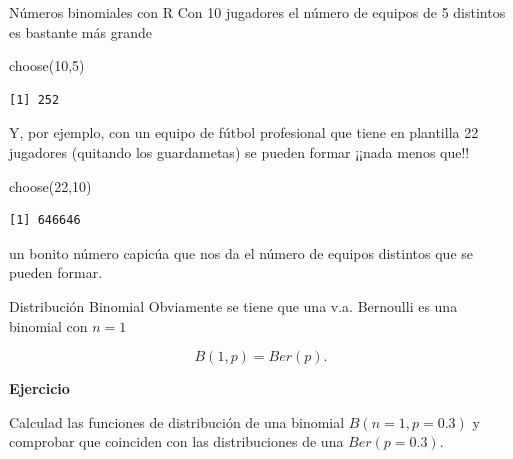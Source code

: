 \documentclass[
  ignorenonframetext,
  aspectratio=169]{beamer}
\newenvironment{Shaded}{\begin{snugshade}}{\end{snugshade}}
\newcommand{\DecValTok}[1]{\textcolor[rgb]{0.68,0.00,0.00}{#1}}
\newcommand{\FunctionTok}[1]{\textcolor[rgb]{0.28,0.35,0.67}{#1}}
\newcommand{\NormalTok}[1]{\textcolor[rgb]{0.00,0.23,0.31}{#1}}
\begin{document}
\begin{frame}[fragile]{Números binomiales con R}
\protect\hypertarget{nuxfameros-binomiales-con-r-1}{}
Con 10 jugadores el número de equipos de 5 distintos es bastante más
grande

\begin{Shaded}
\begin{Highlighting}[]
\FunctionTok{choose}\NormalTok{(}\DecValTok{10}\NormalTok{,}\DecValTok{5}\NormalTok{)}
\end{Highlighting}
\end{Shaded}

\begin{verbatim}
[1] 252
\end{verbatim}

Y, por ejemplo, con un equipo de fútbol profesional que tiene en
plantilla 22 jugadores (quitando los guardametas) se pueden formar
¡¡nada menos que!!

\begin{Shaded}
\begin{Highlighting}[]
\FunctionTok{choose}\NormalTok{(}\DecValTok{22}\NormalTok{,}\DecValTok{10}\NormalTok{)}
\end{Highlighting}
\end{Shaded}

\begin{verbatim}
[1] 646646
\end{verbatim}

un bonito número capicúa que nos da el número de equipos distintos que
se pueden formar.
\end{frame}

\begin{frame}{Distribución Binomial}
\protect\hypertarget{distribuciuxf3n-binomial-2}{}
Obviamente se tiene que una v.a. Bernoulli es una binomial con \(n=1\)

\[B(1,p)=Ber(p).\]

\textbf{Ejercicio}

Calculad las funciones de distribución de una binomial \(B(n=1,p=0.3)\)
y comprobar que coinciden con las distribuciones de una \(Ber(p=0.3)\).
\end{frame}
\end{document}
